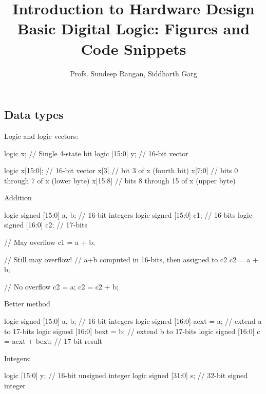 \documentclass[11pt]{article}
\begin{document}
\title{Introduction to Hardware Design\\
Basic Digital Logic:  Figures and Code Snippets}
\author{Profs. Sundeep Rangan, Siddharth Garg}
\date{}

\maketitle

\subsection{Data types}

Logic and logic vectors:


\begin{systemverilogcode}
  logic x;          // Single 4-state bit
  logic [15:0] y;   // 16-bit vector
\end{systemverilogcode}


\begin{systemverilogcode}
  logic x[15:0];     // 16-bit vector
  x[3]  // bit 3 of x (fourth bit)
  x[7:0] // bits 0 through 7 of x (lower byte)
  x[15:8] // bits 8 through 15 of x (upper byte)
\end{systemverilogcode}

Addition

\begin{systemverilogcode}
  logic signed [15:0] a, b; // 16-bit integers
  logic signed [15:0] c1;  // 16-bits
  logic signed [16:0] c2;  // 17-bits

  // May overflow
  c1 = a + b;

  // Still may overflow!
  // a+b computed in 16-bits, then assigned to c2
  c2 = a + b;

  // No overflow
  c2 = a;
  c2 = c2 + b;
\end{systemverilogcode}

Better method
\begin{systemverilogcode}
  logic signed [15:0] a, b; // 16-bit integers
  logic signed [16:0] aext = a; // extend a to 17-bits
  logic signed [16:0] bext = b; // extend b to 17-bits
  logic signed [16:0] c = aext + bext; // 17-bit result
\end{systemverilogcode}


Integers:

\begin{systemverilogcode}
  logic [15:0] y;   // 16-bit unsigned integer
  logic signed [31:0] s; // 32-bit signed integer
\end{systemverilogcode}
\end{document}
